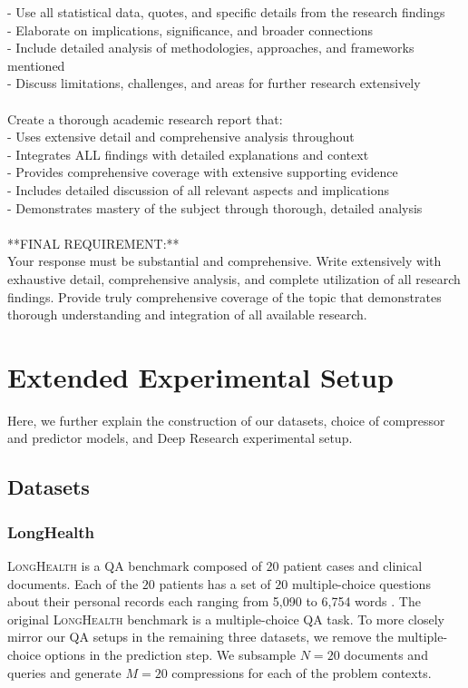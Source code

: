 \documentclass{article} %
\begin{document}
\begin{examplebox}
- Use all statistical data, quotes, and specific details from the research findings\\
- Elaborate on implications, significance, and broader connections\\
- Include detailed analysis of methodologies, approaches, and frameworks mentioned\\
- Discuss limitations, challenges, and areas for further research extensively\\
\\
Create a thorough academic research report that:\\
- Uses extensive detail and comprehensive analysis throughout\\
- Integrates ALL findings with detailed explanations and context\\
- Provides comprehensive coverage with extensive supporting evidence\\
- Includes detailed discussion of all relevant aspects and implications\\
- Demonstrates mastery of the subject through thorough, detailed analysis\\
\\
**FINAL REQUIREMENT:**\\
Your response must be substantial and comprehensive. Write extensively with exhaustive detail, comprehensive analysis, and complete utilization of all research findings. Provide truly comprehensive coverage of the topic that demonstrates thorough understanding and integration of all available research.
\end{examplebox}

\section{Extended Experimental Setup}
\label{sec:appendix-exp-setup}

Here, we further explain the construction of our datasets, choice of compressor and predictor models, and Deep Research experimental setup.

\subsection{Datasets}
\label{sec:appendix-dataset}

\subsubsection{LongHealth}
\label{sec:appendix-longhealth} 
\textsc{LongHealth} is a QA benchmark composed of $20$ patient cases and clinical documents. Each of the $20$ patients has a set of $20$ multiple-choice questions about their personal records each ranging from 5{,}090 to 6{,}754 words \citep{adams2024longhealth}. The original \textsc{LongHealth} benchmark is a multiple-choice QA task. To more closely mirror our QA setups in the remaining three datasets, we remove the multiple-choice options in the prediction step. We subsample $N=20$ documents and queries and generate $M=20$ compressions for each of the problem contexts.
\end{document}
